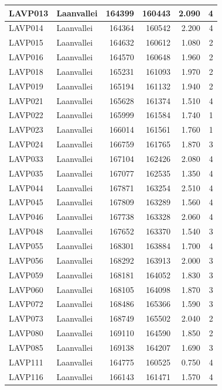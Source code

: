 \documentclass[11pt,]{book}
\begin{document}
\begin{table}
\begin{tabular}[t]{l|l|r|r|r|r}
LAVP013 & Laanvallei & 164399 & 160443 & 2.090 & 4\\
\hline
LAVP014 & Laanvallei & 164364 & 160542 & 2.200 & 4\\
\hline
LAVP015 & Laanvallei & 164632 & 160612 & 1.080 & 2\\
\hline
LAVP016 & Laanvallei & 164570 & 160648 & 1.960 & 2\\
\hline
LAVP018 & Laanvallei & 165231 & 161093 & 1.970 & 2\\
\hline
LAVP019 & Laanvallei & 165194 & 161132 & 1.940 & 2\\
\hline
LAVP021 & Laanvallei & 165628 & 161374 & 1.510 & 4\\
\hline
LAVP022 & Laanvallei & 165999 & 161584 & 1.740 & 1\\
\hline
LAVP023 & Laanvallei & 166014 & 161561 & 1.760 & 1\\
\hline
LAVP024 & Laanvallei & 166759 & 161765 & 1.870 & 3\\
\hline
LAVP033 & Laanvallei & 167104 & 162426 & 2.080 & 4\\
\hline
LAVP035 & Laanvallei & 167077 & 162535 & 1.350 & 4\\
\hline
LAVP044 & Laanvallei & 167871 & 163254 & 2.510 & 4\\
\hline
LAVP045 & Laanvallei & 167809 & 163289 & 1.560 & 4\\
\hline
LAVP046 & Laanvallei & 167738 & 163328 & 2.060 & 4\\
\hline
LAVP048 & Laanvallei & 167652 & 163370 & 1.540 & 3\\
\hline
LAVP055 & Laanvallei & 168301 & 163884 & 1.700 & 4\\
\hline
LAVP056 & Laanvallei & 168292 & 163913 & 2.000 & 3\\
\hline
LAVP059 & Laanvallei & 168181 & 164052 & 1.830 & 3\\
\hline
LAVP060 & Laanvallei & 168105 & 164098 & 1.870 & 3\\
\hline
LAVP072 & Laanvallei & 168486 & 165366 & 1.590 & 3\\
\hline
LAVP073 & Laanvallei & 168749 & 165502 & 2.040 & 2\\
\hline
LAVP080 & Laanvallei & 169110 & 164590 & 1.850 & 2\\
\hline
LAVP085 & Laanvallei & 169138 & 164207 & 1.690 & 3\\
\hline
LAVP111 & Laanvallei & 164775 & 160525 & 0.750 & 4\\
\hline
LAVP116 & Laanvallei & 166143 & 161471 & 1.570 & 4\\
\hline

\end{tabular}
\end{table}
\end{document}
